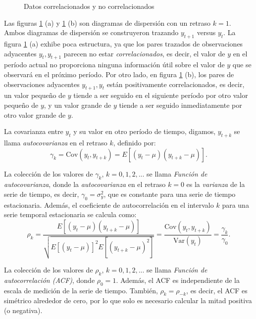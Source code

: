 \begin{figure}[H]
\centering
{}
\caption{Datos correlacionados y no correlacionados}
\label{correlation}
\end{figure}

Las figuras \ref{correlation} (a) y \ref{correlation} (b) son diagramas de dispersión con un retraso $k=1$. Ambos diagramas de dispersión se construyeron trazando $y_{t+1}$ versus $y_{t}$. La figura \ref{correlation} (a)  exhibe poca estructura, ya que los pares trazados de observaciones adyacentes $y_{t}, y_{t+1}$ parecen no estar \textit{correlacionados}, es decir, el valor de $y$ en el período actual no proporciona ninguna información útil sobre el valor de $y$ que se observará en el próximo período. Por otro lado, en figura \ref{correlation}  (b), los pares de observaciones adyacentes $y_{t+1}, y_{t}$ están positivamente correlacionados, es decir, un valor pequeño de $y$ tiende a ser seguido en el siguiente período por otro valor pequeño de $y$, y un valor grande de $y$ tiende a ser seguido inmediatamente por otro valor grande de $y$.

La covarianza entre $y_{t}$ y su valor en otro período de tiempo, digamos, $y_{t+k}$ se llama \textit{autocovarianza} en el retraso $k$, definido por:
\begin{equation}
\gamma_{k} = \text{Cov}(y_{t},y_{t+k}) = E[(y_{t} - \mu)(y_{t+k} - \mu)].
\end{equation}

La colección de los valores de $\gamma_{k}$, $k = 0, 1, 2, ...$ se llama \textit{Función de autocovarianza}, donde la \textit{autocovarianza} en el retraso $k=0$ es la \textit{varianza} de la serie de tiempo, es decir, $\gamma_{0} = \sigma^{2}_{y}$, que es constante para una serie de tiempo estacionaria. Además, el coeficiente de autocorrelación en el intervalo $k$ para una serie temporal estacionaria se calcula como:
\begin{equation}
\rho_{k} = \frac{E[(y_{t} - \mu)(y_{t+k} - \mu)]}{\sqrt{E[(y_{t} - \mu)]^{2} E[(y_{t+k} - \mu)^{2}]}} = \frac{\text{Cov}(y_{t},y_{t+k})}{\text{Var}(y_{t})} = \frac{\gamma_{k}}{\gamma_{0}}.
\end{equation}

La colección de los valores de $\rho_{k}$, $k = 0, 1, 2, ...$ se llama \textit{Función de autocorrelación (ACF)}, donde $\rho_{0} = 1$. Además, el ACF es independiente de la escala de medición de la serie de tiempo. También, $\rho_{k} = \rho_{-k}$, es decir, el ACF es simétrico alrededor de cero, por lo que solo es necesario calcular la mitad positiva (o negativa).

